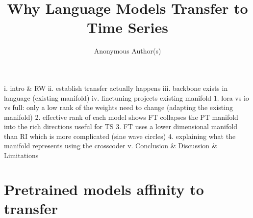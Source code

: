 \documentclass{article}
\title{Why Language Models Transfer to Time Series}
\author{%
  Anonymous Author(s)
}
\begin{document}
\maketitle

\begin{abstract}

\end{abstract}


i. intro \& RW
ii. establish transfer actually happens
iii. backbone exists in language (existing manifold)
iv. finetuning projects existing manifold
    1. lora vs io vs full: only a low rank of the weights need to change (adapting the existing manifold)
    2. effective rank of each model shows FT collapses the PT manifold into the rich directions useful for TS
    3. FT uses a lower dimensional manifold than RI which is more complicated (sine wave circles)
    4. explaining what the manifold represents using the crosscoder
v. Conclusion \& Discussion \& Limitations



 





\section{Pretrained models affinity to transfer}
\label{sec:prior}
\end{document}
